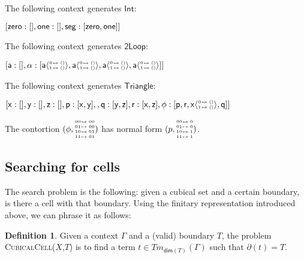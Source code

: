 \documentclass[11pt]{article}
\theoremstyle{definition}
\newtheorem{definition}{Definition}
\newcommand{\continuation}{??}
\newenvironment{examplecontd}[1]
{\renewcommand{\continuation}{\ref{#1}}\expcont[continued]}
{\endexpcont}
\newcommand{\problem}[1]{\textsc{{#1}}}
\newcommand{\mlist}[1]{[ {#1} ]}
\renewcommand{\dim}[1]{\mathsf{dim}({#1})}
\newcommand{\cont}[2]{ \ifthenelse{\equal{#2}{}}{#1}{{#1}\langle{#2}\rangle} }
\newcommand{\cset}[1]{\mathsf{{#1}}}
\newcommand{\boundary}[1]{\partial({#1})}
\newcommand{\substtwo}[2]{\tiny
  \arraycolsep=.4pt\def\arraystretch{1}
  \begin{array}{ll}
    0 &\mapsto {#1} \\
    1 &\mapsto {#2}
  \end{array}
}
\newcommand{\oneconst}{\substtwo{()}{()}}
\newcommand{\oneid}{\substtwo{0}{1}}
\newcommand{\substfour}[4]{\tiny
  \arraycolsep=.4pt\def\arraystretch{1}
  \begin{array}{ll}
    00 &\mapsto {#1} \\
    01 &\mapsto {#2} \\
    10 &\mapsto {#3} \\
    11 &\mapsto {#4} 
  \end{array}
}
\begin{document}
\begin{examplecontd}{exp:int}
  The following context generates $\cset{Int}$:
  
  $\mlist{ \cset{zero} : \mlist{} , \cset{one} : \mlist{} , \cset{seg} : \mlist{
      \cont{\cset{zero}}{}, \cont{\cset{one}}{} }}$
\end{examplecontd}

\begin{examplecontd}{exp:loopspace}
  The following context generates $\cset{2Loop}$:

  $\mlist{ \cset{a} : \mlist{} , \cset{\alpha} : \mlist{ \cont{\cset{a}}{\oneconst} , \cont{\cset{a}}{\oneconst} ,
  \cont{\cset{a}}{\oneconst}, \cont{\cset{a}}{\oneconst} }}$
  
\end{examplecontd}

\begin{examplecontd}{exp:triangle}
  The following context generates $\cset{Triangle}$:
  

  $\mlist{ \cset{x} : \mlist{} , \cset{y} : \mlist{} , \cset{z} : \mlist{} ,
    \cset{p} : \mlist{ \cset{x}, \cset{y}  } ,
    , \cset{q} : \mlist{ \cset{y}, \cset{z} }
    , \cset{r} : \mlist{ \cset{x}, \cset{z} }
    , \cset{\phi} : \mlist{ \cset{p} , \cset{r} ,
      \cont{\cset{x}}{\oneconst}, \cset{q} }
  }$
  
  The contortion $(\phi,\substfour{00}{00}{01}{01})$ has normal form $(p,\substfour{0}{0}{1}{1})$.
\end{examplecontd}

\subsection{Searching for cells}

The search problem is the following: given a cubical set and a certain boundary,
is there a cell with that boundary. Using the finitary representation introduced
above, we can phrase it as follows:
  
\begin{definition}
  Given a context $\Gamma$ and a (valid) boundary $T$, the problem
  \problem{CubicalCell}($X$,$T$) is to find a term $t \in Tm_{\dim{T}}(\Gamma)$ such that
  $\boundary{t} = T$.
\end{definition}
\end{document}
